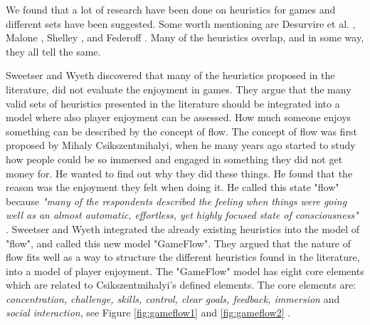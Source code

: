We found that a lot of research have been done on heuristics for games and different sets have been suggested. Some worth mentioning are Desurvire et al. \cite{desurvire}, Malone \cite{malone}, Shelley \cite{shelley}, and Federoff \cite{federoff}. Many of the heuristics overlap, and in some way, they all tell the same. 

Sweetser and Wyeth \cite{sweetser} discovered that many of the heuristics proposed in the literature, did not evaluate the enjoyment in games. They argue that the many valid sets of heuristics presented in the literature should be integrated into a model where also player enjoyment can be assessed. How much someone enjoys something can be described by the concept of flow. The concept of flow was first proposed by  Mihaly Csikszentmihalyi, when he many years ago started  to study how people could be so immersed and engaged in something they did not get money for. He wanted to find out why they did these things. He found that the reason was the enjoyment they felt when doing it. He called this state "flow" because \emph{"many of the respondents described the feeling when things were going well as an almost automatic, effortless, yet highly focused state of consciousness"} \cite{flow}.  Sweetser and Wyeth integrated the already existing heuristics into the model of "flow", and called this new model "GameFlow".  They argued that the nature of flow fits well as a way to structure the different heuristics found in the literature, into a model of player enjoyment. The "GameFlow" model has eight core elements which are related to Csikszentmihalyi's defined elements. The core elements are: \emph{concentration, challenge, skills, control, clear goals, feedback, immersion} and \emph{social interaction}, see Figure \ref{fig:gameflow1} and \ref{fig:gameflow2} \cite{sweetser}. 


